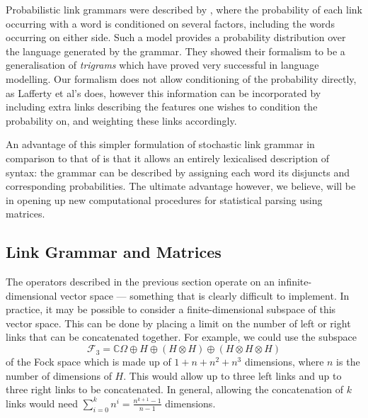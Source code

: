 Probabilistic link grammars were described by \cite{Lafferty:92}, where the probability of each link occurring with a word is conditioned on several factors, including the words occurring on either side. Such a model provides a probability distribution over the language generated by the grammar. They showed their formalism to be a generalisation of \emph{trigrams} which have proved very successful in language modelling. Our formalism does not allow conditioning of the probability directly, as Lafferty et al's does, however this information can be incorporated by including extra links describing the features one wishes to condition the probability on, and weighting these links accordingly.




An advantage of this simpler formulation of stochastic link grammar in comparison to that of \cite{Lafferty:92} is that it allows an entirely lexicalised description of syntax: the grammar can be described by assigning each word its disjuncts and corresponding probabilities. The ultimate advantage however, we believe, will be in opening up new computational procedures for statistical parsing using matrices.

\subsection{Link Grammar and Matrices}
\label{lg-matrix-section}

The operators described in the previous section operate on an infinite-dimensional vector space --- something that is clearly difficult to implement. In practice, it may be possible to consider a finite-dimensional subspace of this vector space. This can be done by placing a limit on the number of left or right links that can be concatenated together. For example, we could use the subspace
$$\mathcal{F}_3 = \mathbb{C}\Omega \oplus H \oplus (H \otimes H) \oplus (H \otimes H \otimes H)$$
of the Fock space which is made up of $1 + n + n^2 + n^3$ dimensions, where $n$ is the number of dimensions of $H$. This would allow up to three left links and up to three right links to be concatenated. In general, allowing the concatenation of $k$ links would need $\sum_{i=0}^k n^i = \frac{n^{k+1} - 1}{n - 1}$ dimensions. 

